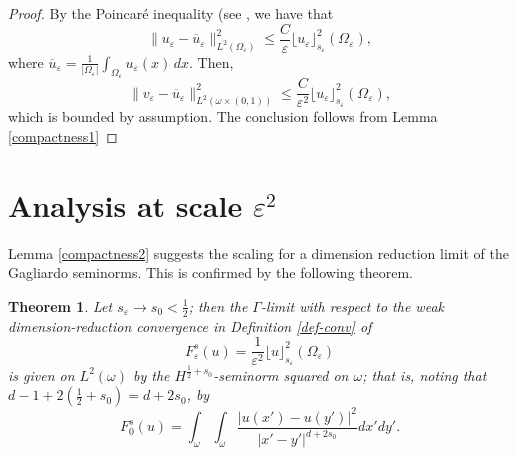 \documentclass[11pt]{article}
\newtheorem{theorem}[definition]{Theorem}
\def\e{\varepsilon}
\begin{document}
%
%
%

\begin{proof}
By the Poincar\'e inequality (see \cite[Theorem 6.33]{leofrac}, we have that 
$$\|u_\e - \overline u_\e \|^2_{L^2(\Omega_\e)}\leq \frac{C}{\e}\lfloor u_\e\rfloor_{s_\e}^2(\Omega_\e), $$
where $\overline u_\e=\frac{1}{|\Omega_\e|}\int_{\Omega_\e} u_\e(x)\, dx$.  
Then, 
$$\|v_\e - \overline u_\e \|^2_{L^2(\omega\times(0,1))}\leq \frac{C}{\e^2}\lfloor u_\e\rfloor_{s_\e}^2(\Omega_\e),$$
which is bounded by assumption. The conclusion follows from Lemma \ref{compactness1}
\end{proof}





\section{Analysis at scale $\e^2$}
Lemma \ref{compactness2} suggests the scaling for a dimension reduction limit of the Gagliardo seminorms. This is confirmed by the following theorem.

\begin{theorem}\label{drconv}
Let $s_\e\to s_0<\frac12$; then the $\Gamma$-limit with respect to the weak dimension-reduction convergence in Definition {\rm\ref{def-conv}} of 
$$
F_\e^s(u)=\frac1{\e^2} \lfloor u\rfloor^2_{s_\e}(\Omega_\e)
$$
is given on $L^2(\omega)$ by the $H^{\frac12+s_0}$-seminorm squared on $\omega$; that is, noting that
$d-1+2(\frac12+s_0)=d+2s_0$, by 
$$
F^s_0(u)=\int_\omega\int_\omega 
\frac{|u(x')-u(y')|^2}{|x'-y'|^{d+2s_0}}dx' dy'.
$$
\end{theorem}
\end{document}
